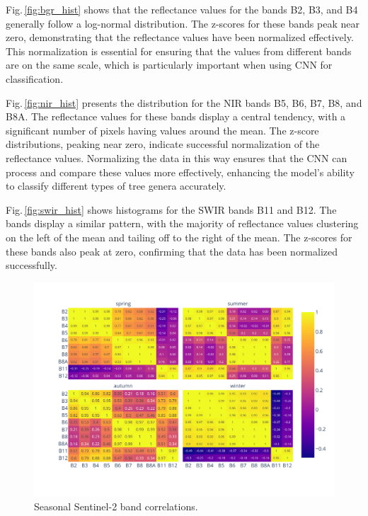 Fig.\,\ref{fig:bgr_hist} shows that the reflectance values for the bands B2, B3, and B4 generally follow a log-normal distribution. The z-scores for these bands peak near zero, demonstrating that the reflectance values have been normalized effectively. This normalization is essential for ensuring that the values from different bands are on the same scale, which is particularly important when using CNN for classification.

Fig.\,\ref{fig:nir_hist} presents the distribution for the NIR bands B5, B6, B7, B8, and B8A. The reflectance values for these bands display a central tendency, with a significant number of pixels having values around the mean. The z-score distributions, peaking near zero, indicate successful normalization of the reflectance values. Normalizing the data in this way ensures that the CNN can process and compare these values more effectively, enhancing the model's ability to classify different types of tree genera accurately.

Fig.\,\ref{fig:swir_hist} shows histograms for the SWIR bands B11 and B12. The bands display a similar pattern, with the majority of reflectance values clustering on the left of the mean and tailing off to the right of the mean. The z-scores for these bands also peak at zero, confirming that the data has been normalized successfully. 


\begin{figure}[ht]
    \centering
    \includegraphics[width=0.98\linewidth, trim={40pt 40pt 10pt 30pt}, clip]{figures/figures_features/season_correlation.pdf}
    \caption{Seasonal Sentinel-2 band correlations.}
    \label{fig:season_correlation}
\end{figure}

